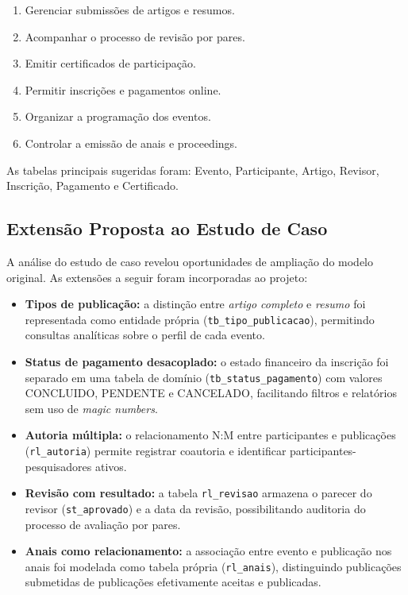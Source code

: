 \documentclass[12pt,a4paper]{article}
\begin{document}
\begin{enumerate}
    \item Gerenciar submissões de artigos e resumos.
    \item Acompanhar o processo de revisão por pares.
    \item Emitir certificados de participação.
    \item Permitir inscrições e pagamentos online.
    \item Organizar a programação dos eventos.
    \item Controlar a emissão de anais e proceedings.
\end{enumerate}

As tabelas principais sugeridas foram: Evento, Participante, Artigo, Revisor,
Inscrição, Pagamento e Certificado.

\subsection{Extensão Proposta ao Estudo de Caso}
\label{subsec:caso-estendido}

A análise do estudo de caso revelou oportunidades de ampliação do modelo original. As extensões a seguir foram incorporadas ao projeto:

\begin{itemize}
    \item \textbf{Tipos de publicação:} a distinção entre \emph{artigo completo}
    e \emph{resumo} foi representada como entidade própria (\texttt{tb\_tipo\_publicacao}),
    permitindo consultas analíticas sobre o perfil de cada evento.

    \item \textbf{Status de pagamento desacoplado:} o estado financeiro da inscrição
    foi separado em uma tabela de domínio (\texttt{tb\_status\_pagamento}) com valores
    CONCLUIDO, PENDENTE e CANCELADO, facilitando filtros e relatórios sem uso de
    \emph{magic numbers}.

    \item \textbf{Autoria múltipla:} o relacionamento N:M entre participantes e
    publicações (\texttt{rl\_autoria}) permite registrar coautoria e identificar
    participantes-pesquisadores ativos.

    \item \textbf{Revisão com resultado:} a tabela \texttt{rl\_revisao} armazena o
    parecer do revisor (\texttt{st\_aprovado}) e a data da revisão, possibilitando
    auditoria do processo de avaliação por pares.

    \item \textbf{Anais como relacionamento:} a associação entre evento e publicação
    nos anais foi modelada como tabela própria (\texttt{rl\_anais}), distinguindo
    publicações submetidas de publicações efetivamente aceitas e publicadas.
\end{itemize}
\end{document}
